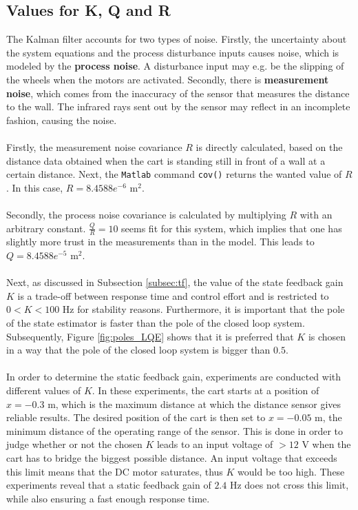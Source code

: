 \documentclass[a4paper,kul]{kulakarticle} %
\begin{document}
\subsection{Values for K, Q and R}
\label{subsec:kqr}
The Kalman filter accounts for two types of noise. Firstly, the uncertainty about the system equations and the process disturbance inputs causes noise, which is modeled by the \textbf{process noise}. A disturbance input may e.g. be the slipping of the wheels when the motors are activated. Secondly, there is \textbf{measurement noise}, which comes from the inaccuracy of the sensor that measures the distance to the wall. The infrared rays sent out by the sensor may reflect in an incomplete fashion, causing the noise. 
\\\\
Firstly, the measurement noise covariance $R$ is directly calculated, based on the distance data obtained when the cart is standing still in front of a wall at a certain distance. Next, the \texttt{Matlab} command \texttt{cov()} returns the wanted value of $R$. In this case, $R = 8.4588 e^{-6}$ m$^2$.
\\\\
Secondly, the process noise covariance is calculated by multiplying $R$ with an arbitrary constant. $\frac{Q}{R} = 10$ seems fit for this system, which implies that one has slightly more trust in the measurements than in the model. This leads to $Q = 8.4588 e^{-5}$ m$^2$.
\\\\
Next, as discussed in Subsection \ref{subsec:tf}, the value of the state feedback gain $K$ is a trade-off between response time and control effort and is restricted to $0 < K < 100$ Hz for stability reasons. Furthermore, it is important that the pole of the state estimator is faster than the pole of the closed loop system. Subsequently, Figure \ref{fig:poles_LQE} shows that it is preferred that $K$ is chosen in a way that the pole of the closed loop system is bigger than $0.5$.
\\\\
In order to determine the static feedback gain, experiments are conducted with different values of $K$. In these experiments, the cart starts at a position of $x = -0.3$ m, which is the maximum distance at which the distance sensor gives reliable results. The desired position of the cart is then set to $x = -0.05$ m, the minimum distance of the operating range of the sensor. This is done in order to judge whether or not the chosen $K$ leads to an input voltage of $> 12$ V when the cart has to bridge the biggest possible distance. An input voltage that exceeds this limit means that the DC motor saturates, thus $K$ would be too high. These experiments reveal that a static feedback gain of $2.4$ Hz does not cross this limit, while also ensuring a fast enough response time.
\end{document}
